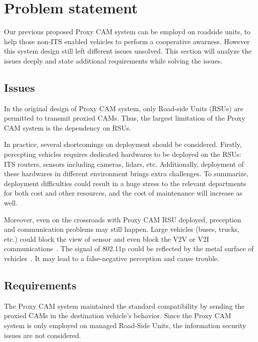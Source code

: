 \section{Problem statement} \label{sec:problem}

Our previous proposed Proxy CAM system can be employd on roadside units,
to help those non-ITS enabled vehicles to perform a cooperative awarness.
However this system design still left different issues unsolved.
This section will analyze the issues deeply and state additional requirements while solving the issues.

\subsection{Issues}
In the original design of Proxy CAM system, only Road-side Units (RSUs) are permitted to transmit proxied CAMs.
Thus, the largest limitation of the Proxy CAM system is the dependency on RSUs.

In practice, several shortcomings on deployment should be considered.
Firstly, percepting vehicles requires dedicated hardwares to be deployed on the RSUs:
ITS routers, sensors including cameras, lidars, etc.
Additionally, deployment of these hardwares in different environment brings extra challenges.
To summarize, deployment difficulties could result in a huge stress to the relevant departments for both cost and other resources,
and the cost of maintenance will increase as well.

Moreover, even on the crossroads with Proxy CAM RSU deployed,
preception and communication problems may still happen.
Large vehicles (buses, trucks, etc.) could block the view of sensor and even block the V2V or V2I communications~\cite{d2014empirical}.
The signal of 802.11p could be reflected by the metal surface of vehicles~\cite{mecklenbrauker2011vehicular}.
It may lead to a false-negative perception and cause trouble.

\subsection{Requirements}

The Proxy CAM system maintained the standard compatibility by sending the proxied CAMs in the destination vehicle's behavior.
Since the Proxy CAM system is only employed on managed Road-Side Units, the information security issues are not considered.

